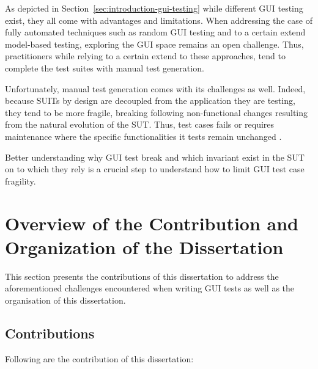 As depicted in Section~\ref{sec:introduction-gui-testing} while different GUI testing exist, they all come with advantages and limitations. When addressing the case of fully automated techniques such as random GUI testing and to a certain extend model-based testing, exploring the GUI space remains an open challenge. Thus, practitioners while relying to a certain extend to these approaches, tend to complete the test suites with manual test generation.

Unfortunately, manual test generation comes with its challenges as well. Indeed, because SUITs by design are decoupled from the application they are testing, they tend to be more fragile, \ie breaking following non-functional changes resulting from the natural evolution of the SUT. Thus, test cases fails or requires maintenance where the specific functionalities it tests remain unchanged \cite{Coppola2019, DiMartino2021}.

Better understanding why GUI test break and which invariant exist in the SUT on to which they rely is a crucial step to understand how to limit GUI test case fragility.

\section{Overview of the Contribution and Organization of the Dissertation}

This section presents the contributions of this dissertation to address the aforementioned challenges encountered when writing GUI tests as well as the organisation of this dissertation.

\subsection{Contributions}

Following are the contribution of this dissertation:


